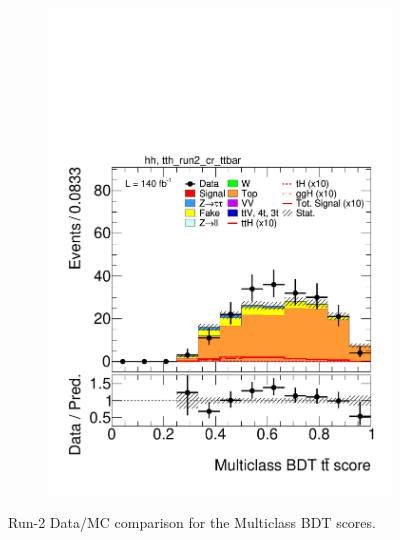\begin{figure}[htbp]
\begin{subfigure}[b]{0.49\textwidth}
  \end{subfigure}
  \hfill
  \begin{subfigure}[b]{0.49\textwidth}
    \centering
    \includegraphics[width=\textwidth]{images/plots_modelling_run2_run3_variables/run_2_tth/plot_tth_th_multiclass_ttbar_hh_tth_run2_cr_ttbar_15_16_17_18.pdf}
    \caption{}

  \end{subfigure}

  \caption{Run-2 Data/MC comparison for the Multiclass BDT scores.}
  \label{scores_modelling_2}
\end{figure}

